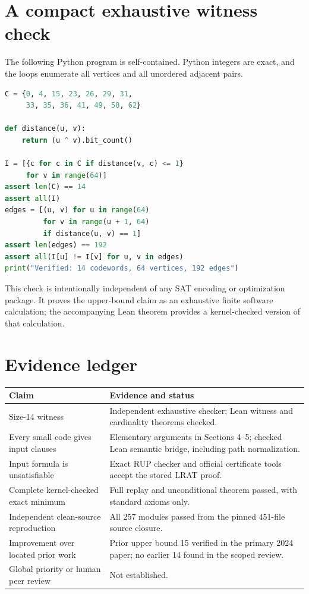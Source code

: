 \documentclass[11pt]{article}
\begin{document}
\section{A compact exhaustive witness check}\label{app:witness}
The following Python program is self-contained. Python integers are exact, and the loops enumerate all vertices and all unordered adjacent pairs.
\par\noindent\begin{minipage}{\textwidth}
\begin{lstlisting}[language=Python,basicstyle=\ttfamily\footnotesize,showstringspaces=false]
C = {0, 4, 15, 23, 26, 29, 31,
     33, 35, 36, 41, 49, 58, 62}

def distance(u, v):
    return (u ^ v).bit_count()

I = [{c for c in C if distance(v, c) <= 1}
     for v in range(64)]
assert len(C) == 14
assert all(I)
edges = [(u, v) for u in range(64)
         for v in range(u + 1, 64)
         if distance(u, v) == 1]
assert len(edges) == 192
assert all(I[u] != I[v] for u, v in edges)
print("Verified: 14 codewords, 64 vertices, 192 edges")
\end{lstlisting}
\end{minipage}

This check is intentionally independent of any SAT encoding or optimization package. It proves the upper-bound claim as an exhaustive finite software calculation; the accompanying Lean theorem provides a kernel-checked version of that calculation.

\section{Evidence ledger}
{\small
\begin{center}
\begin{tabular}{>{\raggedright\arraybackslash}p{}>{\raggedright\arraybackslash}p{}}
\toprule
Claim & Evidence and status\\\midrule
Size-14 witness & Independent exhaustive checker; Lean witness and cardinality theorems checked.\\[2pt]
Every small code gives input clauses & Elementary arguments in Sections 4--5; checked Lean semantic bridge, including path normalization.\\[2pt]
Input formula is unsatisfiable & Exact RUP checker and official certificate tools accept the stored LRAT proof.\\[2pt]
Complete kernel-checked exact minimum & Full replay and unconditional theorem passed, with standard axioms only.\\[2pt]
Independent clean-source reproduction & All 257 modules passed from the pinned 451-file source closure.\\[2pt]
Improvement over located prior work & Prior upper bound 15 verified in the primary 2024 paper; no earlier 14 found in the scoped review.\\[2pt]
Global priority or human peer review & Not established.\\\bottomrule
\end{tabular}
\end{center}
}
\end{document}
